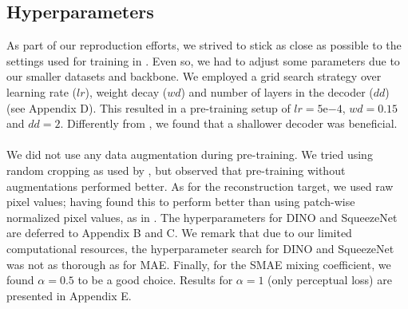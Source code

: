 \subsection{Hyperparameters}
\label{sec:hyperparameters}


As part of our reproduction efforts, we strived to stick as close as possible to the settings used for training in \cite{mae}. Even so, we had to adjust some parameters due to our smaller datasets and backbone. We employed a grid search strategy over learning rate ($lr$), weight decay ($wd$) and number of layers in the decoder ($dd$) (see Appendix D). This resulted in a pre-training setup of $lr=5\mathrm{e}{-4}$, $wd=0.15$ and $dd=2$. Differently from \cite{mae}, we found that a shallower decoder was beneficial.
\\\\
We did not use any data augmentation during pre-training. We tried using random cropping as used by \cite{mae}, but observed that pre-training without augmentations performed better. As for the reconstruction target, we used raw pixel values; having found this to perform better than using patch-wise normalized pixel values, as in \cite{mae}. The hyperparameters for DINO and SqueezeNet are deferred to Appendix B and C. We remark that due to our limited computational resources, the hyperparameter search for DINO and SqueezeNet was not as thorough as for MAE. Finally, for the SMAE mixing coefficient, we found $\alpha=0.5$ to be a good choice. Results for $\alpha=1$ (only perceptual loss) are presented in Appendix E. 

